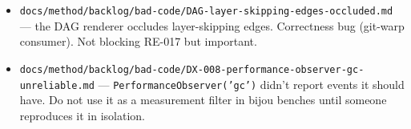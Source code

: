 \begin{itemize}
\item
  \texttt{d\allowbreak{}o\allowbreak{}c\allowbreak{}s\allowbreak{}/\allowbreak{}m\allowbreak{}e\allowbreak{}t\allowbreak{}h\allowbreak{}o\allowbreak{}d\allowbreak{}/\allowbreak{}b\allowbreak{}a\allowbreak{}c\allowbreak{}k\allowbreak{}l\allowbreak{}o\allowbreak{}g\allowbreak{}/\allowbreak{}b\allowbreak{}a\allowbreak{}d\allowbreak{}-\allowbreak{}c\allowbreak{}o\allowbreak{}d\allowbreak{}e\allowbreak{}/\allowbreak{}D\allowbreak{}A\allowbreak{}G\allowbreak{}-\allowbreak{}l\allowbreak{}a\allowbreak{}y\allowbreak{}e\allowbreak{}r\allowbreak{}-\allowbreak{}s\allowbreak{}k\allowbreak{}i\allowbreak{}p\allowbreak{}p\allowbreak{}i\allowbreak{}n\allowbreak{}g\allowbreak{}-\allowbreak{}e\allowbreak{}d\allowbreak{}g\allowbreak{}e\allowbreak{}s\allowbreak{}-\allowbreak{}o\allowbreak{}c\allowbreak{}c\allowbreak{}l\allowbreak{}u\allowbreak{}d\allowbreak{}e\allowbreak{}d\allowbreak{}.\allowbreak{}m\allowbreak{}d} --- the DAG renderer occludes layer-skipping edges. Correctness bug (git-warp consumer). Not blocking RE-017 but important.
\item
  \texttt{d\allowbreak{}o\allowbreak{}c\allowbreak{}s\allowbreak{}/\allowbreak{}m\allowbreak{}e\allowbreak{}t\allowbreak{}h\allowbreak{}o\allowbreak{}d\allowbreak{}/\allowbreak{}b\allowbreak{}a\allowbreak{}c\allowbreak{}k\allowbreak{}l\allowbreak{}o\allowbreak{}g\allowbreak{}/\allowbreak{}b\allowbreak{}a\allowbreak{}d\allowbreak{}-\allowbreak{}c\allowbreak{}o\allowbreak{}d\allowbreak{}e\allowbreak{}/\allowbreak{}D\allowbreak{}X\allowbreak{}-\allowbreak{}0\allowbreak{}0\allowbreak{}8\allowbreak{}-\allowbreak{}p\allowbreak{}e\allowbreak{}r\allowbreak{}f\allowbreak{}o\allowbreak{}r\allowbreak{}m\allowbreak{}a\allowbreak{}n\allowbreak{}c\allowbreak{}e\allowbreak{}-\allowbreak{}o\allowbreak{}b\allowbreak{}s\allowbreak{}e\allowbreak{}r\allowbreak{}v\allowbreak{}e\allowbreak{}r\allowbreak{}-\allowbreak{}g\allowbreak{}c\allowbreak{}-\allowbreak{}u\allowbreak{}n\allowbreak{}r\allowbreak{}e\allowbreak{}l\allowbreak{}i\allowbreak{}a\allowbreak{}b\allowbreak{}l\allowbreak{}e\allowbreak{}.\allowbreak{}m\allowbreak{}d} --- \texttt{P\allowbreak{}e\allowbreak{}r\allowbreak{}f\allowbreak{}o\allowbreak{}r\allowbreak{}m\allowbreak{}a\allowbreak{}n\allowbreak{}c\allowbreak{}e\allowbreak{}O\allowbreak{}b\allowbreak{}s\allowbreak{}e\allowbreak{}r\allowbreak{}v\allowbreak{}e\allowbreak{}r\allowbreak{}(\allowbreak{}'\allowbreak{}g\allowbreak{}c\allowbreak{}'\allowbreak{})} didn't report events it should have. Do not use it as a measurement filter in bijou benches until someone reproduces it in isolation.
\end{itemize}

